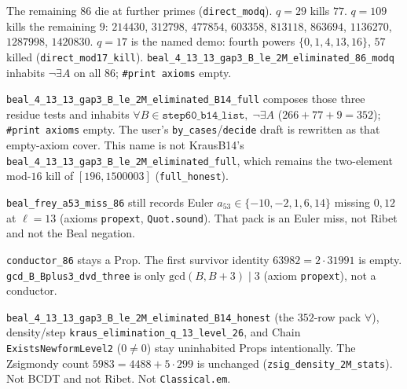 \documentclass[12pt]{amsart}
\begin{document}
The remaining $86$ die at further primes
(\texttt{direct\_modq}).
$q=29$ kills $77$.
$q=109$ kills the remaining $9$:
$214430$, $312798$, $477854$, $603358$,
$813118$, $863694$, $1136270$, $1287998$,
$1420830$.
$q=17$ is the named demo: fourth powers
$\{0,1,4,13,16\}$, $57$ killed
(\texttt{direct\_mod17\_kill}).
\texttt{beal\_4\_13\_13\_gap3\_B\_le\_2M\_eliminated\_86\_modq}
inhabits $\neg\exists A$ on all $86$;
\texttt{\#print axioms} empty.

\texttt{beal\_4\_13\_13\_gap3\_B\_le\_2M\_eliminated\_B14\_full}
composes those three residue tests and inhabits
$\forall B\in\texttt{step60\_b14\_list},\;\neg\exists A$
($266+77+9=352$); \texttt{\#print axioms} empty.
The user's \texttt{by\_cases}/\texttt{decide} draft
is rewritten as that empty-axiom cover.
This name is not KrausB14's
\texttt{beal\_4\_13\_13\_gap3\_B\_le\_2M\_eliminated\_full},
which remains the two-element mod-$16$ kill of
$[196,1500003]$
(\texttt{full\_honest}).

\texttt{beal\_frey\_a53\_miss\_86} still records
Euler $a_{53}\in\{-10,-2,1,6,14\}$ missing
$0,12$ at $\ell=13$
(axioms \texttt{propext}, \texttt{Quot.sound}).
That pack is an Euler miss, not Ribet and not
the Beal negation.

\texttt{conductor\_86} stays a Prop.
The first survivor identity
$63982=2\cdot 31991$ is empty.
\texttt{gcd\_B\_Bplus3\_dvd\_three} is only
$\mathrm{gcd}(B,B+3)\mid 3$ (axiom \texttt{propext}),
not a conductor.

\texttt{beal\_4\_13\_13\_gap3\_B\_le\_2M\_eliminated\_B14\_honest}
(the $352$-row pack $\forall$),
density/step
\texttt{kraus\_elimination\_q\_13\_level\_26},
and Chain \texttt{ExistsNewformLevel2}
($0\neq 0$) stay uninhabited Props
intentionally.
The Zsigmondy count $5983=4488+5\cdot 299$
is unchanged (\texttt{zsig\_density\_2M\_stats}).
Not BCDT and not Ribet.  Not \texttt{Classical.em}.

\end{document}
